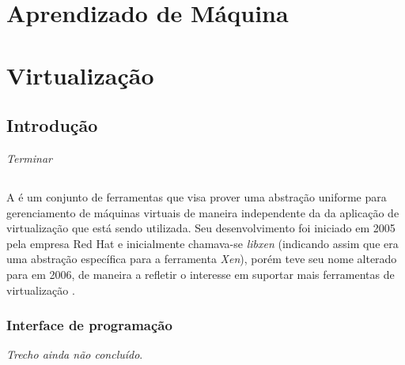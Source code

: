 %
%

\chapter{Aprendizado de Máquina}\label{sec:aprendizado}



\chapter{Virtualização}\label{sec:virt}

\section{Introdução}

\emph{Terminar}



\section{\libvirt}\label{sec:libvirt}


A \libvirt{} é um conjunto de ferramentas que visa prover uma abstração
uniforme para gerenciamento de máquinas virtuais de maneira independente da
da aplicação de virtualização que está sendo utilizada. Seu desenvolvimento
foi iniciado em 2005 pela empresa Red Hat e inicialmente chamava-se
\emph{libxen} (indicando assim que era uma abstração específica para a
ferramenta \emph{Xen}), porém teve seu nome alterado para \libvirt{} em
2006, de maneira a refletir o interesse em suportar mais ferramentas de
virtualização .

\subsection{Interface de programação}\label{sec:libvirtapi}

\emph{Trecho ainda não concluído}.
